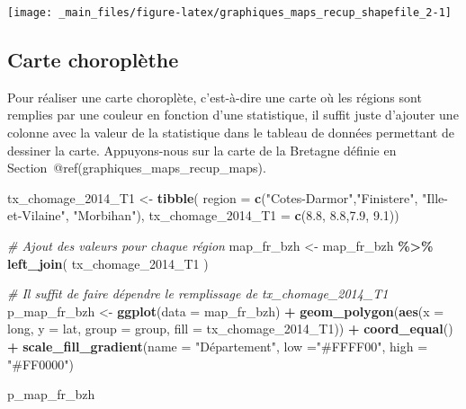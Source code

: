 \documentclass[
  11pt,
]{book}
\newenvironment{Shaded}{\begin{snugshade}}{\end{snugshade}}
\newcommand{\CommentTok}[1]{\textcolor[rgb]{0.56,0.35,0.01}{\textit{#1}}}
\newcommand{\DataTypeTok}[1]{\textcolor[rgb]{0.13,0.29,0.53}{#1}}
\newcommand{\DecValTok}[1]{\textcolor[rgb]{0.00,0.00,0.81}{#1}}
\newcommand{\FloatTok}[1]{\textcolor[rgb]{0.00,0.00,0.81}{#1}}
\newcommand{\KeywordTok}[1]{\textcolor[rgb]{0.13,0.29,0.53}{\textbf{#1}}}
\newcommand{\NormalTok}[1]{#1}
\newcommand{\OperatorTok}[1]{\textcolor[rgb]{0.81,0.36,0.00}{\textbf{#1}}}
\newcommand{\StringTok}[1]{\textcolor[rgb]{0.31,0.60,0.02}{#1}}
\numberwithin{equation}{section}
\numberwithin{countremarque}{section}
\begin{document}
\begin{center}\texttt{[image: \_main\_files/figure-latex/graphiques\_maps\_recup\_shapefile\_2-1]} \end{center}

\hypertarget{graphiques_maps_choroplethe}{%
\subsection{Carte choroplèthe}\label{graphiques_maps_choroplethe}}

Pour réaliser une carte choroplète, c'est-à-dire une carte où les régions sont remplies par une couleur en fonction d'une statistique, il suffit juste d'ajouter une colonne avec la valeur de la statistique dans le tableau de données permettant de dessiner la carte. Appuyons-nous sur la carte de la Bretagne définie en Section~@ref(graphiques\_maps\_recup\_maps).

\begin{Shaded}
\begin{Highlighting}[]
\NormalTok{tx\_chomage\_}\DecValTok{2014}\NormalTok{\_T1 \textless{}{-}}\StringTok{ }
\StringTok{  }\KeywordTok{tibble}\NormalTok{(}
  \DataTypeTok{region =} \KeywordTok{c}\NormalTok{(}\StringTok{"Cotes{-}Darmor"}\NormalTok{,}\StringTok{"Finistere"}\NormalTok{,}
             \StringTok{"Ille{-}et{-}Vilaine"}\NormalTok{, }\StringTok{"Morbihan"}\NormalTok{),}
  \DataTypeTok{tx\_chomage\_2014\_T1 =} \KeywordTok{c}\NormalTok{(}\FloatTok{8.8}\NormalTok{, }\FloatTok{8.8}\NormalTok{,}\FloatTok{7.9}\NormalTok{, }\FloatTok{9.1}\NormalTok{))}

\CommentTok{\# Ajout des valeurs pour chaque région}
\NormalTok{map\_fr\_bzh \textless{}{-}}\StringTok{ }
\StringTok{  }\NormalTok{map\_fr\_bzh }\OperatorTok{\%\textgreater{}\%}\StringTok{ }
\StringTok{  }\KeywordTok{left\_join}\NormalTok{(}
\NormalTok{    tx\_chomage\_}\DecValTok{2014}\NormalTok{\_T1}
\NormalTok{  )}


\CommentTok{\# Il suffit de faire dépendre le remplissage de tx\_chomage\_2014\_T1}
\NormalTok{p\_map\_fr\_bzh \textless{}{-}}\StringTok{ }
\StringTok{  }\KeywordTok{ggplot}\NormalTok{(}\DataTypeTok{data =}\NormalTok{ map\_fr\_bzh) }\OperatorTok{+}
\StringTok{  }\KeywordTok{geom\_polygon}\NormalTok{(}\KeywordTok{aes}\NormalTok{(}\DataTypeTok{x =}\NormalTok{ long, }\DataTypeTok{y =}\NormalTok{ lat, }\DataTypeTok{group =}\NormalTok{ group,}
             \DataTypeTok{fill =}\NormalTok{ tx\_chomage\_}\DecValTok{2014}\NormalTok{\_T1)) }\OperatorTok{+}\StringTok{ }
\StringTok{  }\KeywordTok{coord\_equal}\NormalTok{() }\OperatorTok{+}\StringTok{ }
\StringTok{  }\KeywordTok{scale\_fill\_gradient}\NormalTok{(}\DataTypeTok{name =} \StringTok{"Département"}\NormalTok{, }\DataTypeTok{low =}\StringTok{"\#FFFF00"}\NormalTok{, }\DataTypeTok{high =} \StringTok{"\#FF0000"}\NormalTok{)}

\NormalTok{p\_map\_fr\_bzh}
\end{Highlighting}
\end{Shaded}
\end{document}
